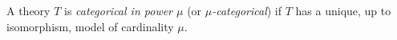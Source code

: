 A theory $T$ is \textit{categorical in power $\mu$} (or \textit{$\mu$-categorical}) if $T$ has a unique, up to isomorphism, model of cardinality $\mu$.
